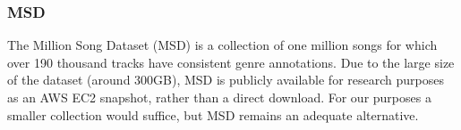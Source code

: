 \subsubsection{MSD}

The Million Song Dataset (MSD) \cite{Bertin-Mahieux2011} is a collection of one million songs for which over 190 thousand tracks have consistent genre annotations. Due to the large size of the dataset (around 300GB), MSD is publicly available for research purposes as an AWS EC2 snapshot, rather than a direct download. For our purposes a smaller collection would suffice, but MSD remains an adequate alternative.
